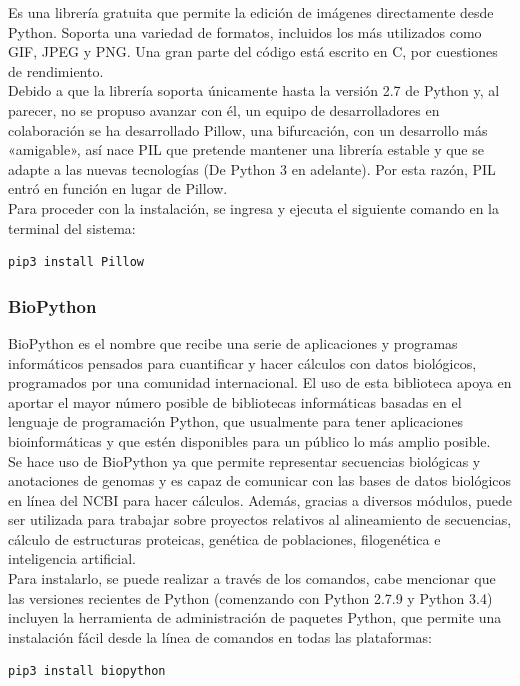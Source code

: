 {{\noindent Es una librería gratuita que permite la edición de imágenes directamente desde Python. Soporta una variedad de formatos, incluidos los más utilizados como GIF, JPEG y PNG. Una gran parte del código está escrito en C, por cuestiones de rendimiento.\\

\noindent Debido a que la librería soporta únicamente hasta la versión 2.7 de Python y, al parecer, no se propuso avanzar con él, un equipo de desarrolladores en colaboración se ha desarrollado Pillow, una bifurcación, con un desarrollo más «amigable», así nace PIL que pretende mantener una librería estable y que se adapte a las nuevas tecnologías (De Python 3 en adelante). Por esta razón, PIL entró en función en lugar de Pillow.\\

\noindent Para proceder con la instalación, se ingresa y ejecuta el siguiente comando en la terminal del sistema:

\begin{lstlisting}
pip3 install Pillow
\end{lstlisting}

\subsubsection{BioPython}

\noindent BioPython es el nombre que recibe una serie de aplicaciones y programas informáticos pensados para cuantificar y hacer cálculos con datos biológicos, programados por una comunidad internacional. El uso de esta biblioteca apoya en aportar el mayor número posible de bibliotecas informáticas basadas en el lenguaje de programación Python, que usualmente para tener aplicaciones bioinformáticas y que estén disponibles para un público lo más amplio posible.\\

\noindent Se hace uso de BioPython ya que   permite representar secuencias biológicas y anotaciones de genomas y es capaz de comunicar con las bases de datos biológicos en línea del NCBI para hacer cálculos. Además, gracias a diversos módulos, puede ser utilizada para trabajar sobre proyectos relativos al alineamiento de secuencias, cálculo de estructuras proteicas, genética de poblaciones, filogenética e inteligencia artificial.\\

\noindent Para instalarlo, se puede realizar a través de los comandos, cabe mencionar que las versiones recientes de Python (comenzando con Python 2.7.9 y Python 3.4) incluyen la herramienta de administración de paquetes Python, que permite una instalación fácil desde la línea de comandos en todas las plataformas:
\begin{lstlisting}
pip3 install biopython
\end{lstlisting}

}}
